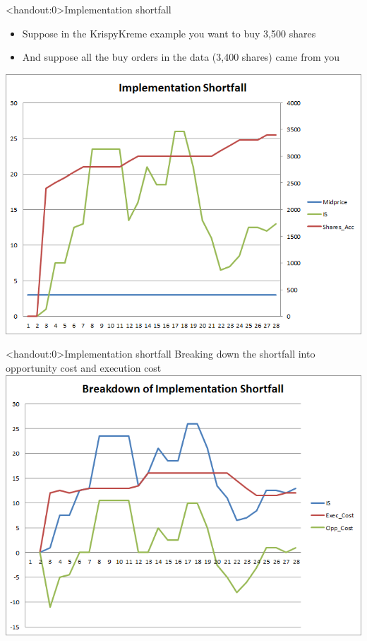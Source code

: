 \documentclass[english,10pt
,aspectratio=169
]{beamer}
\begin{document}
\begin{frame}<handout:0>{Implementation shortfall}
	\begin{itemize}
		\item Suppose in the KrispyKreme example you want to buy 3,500 shares
		\item And suppose all the buy orders in the data (3,400 shares) came from you
	\end{itemize}
	\center
	\includegraphics[scale=0.39]{pics/L2_is}
\end{frame}


\begin{frame}<handout:0>{Implementation shortfall}
	Breaking down the shortfall into opportunity cost and execution cost
	\center
	\includegraphics[scale=0.39]{pics/L2_is2}
\end{frame}
\end{document}
